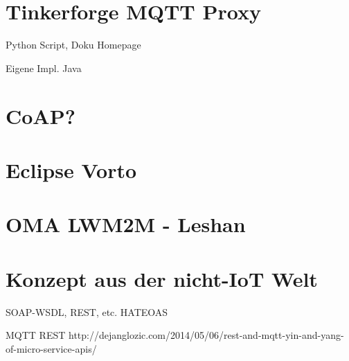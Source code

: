 \section{Tinkerforge MQTT Proxy}

Python Script, Doku Homepage

Eigene Impl. Java

\section{CoAP?}

\section{Eclipse Vorto}

\section{OMA LWM2M - Leshan}

\section{Konzept aus der nicht-IoT Welt}
SOAP-WSDL, REST, etc.
HATEOAS

MQTT REST
http://dejanglozic.com/2014/05/06/rest-and-mqtt-yin-and-yang-of-micro-service-apis/

